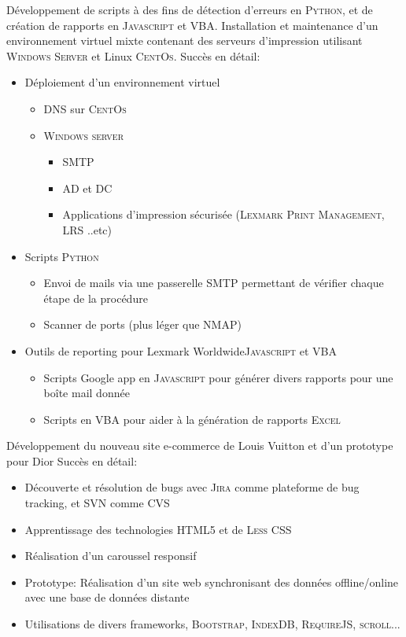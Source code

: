 \documentclass[11pt,a4paper,sans]{moderncv} %
\begin{document}
{Développement de scripts à des fins de détection d'erreurs en \textsc{Python}, et de création de rapports en \textsc{Javascript}
et \textsc{VBA}. Installation et maintenance d'un environnement virtuel mixte contenant des serveurs d'impression utilisant
\textsc{Windows Server} et Linux \textsc{CentOs}.
\newline{}
Succès en détail:
\begin{itemize}
\item Déploiement d'un environnement virtuel
\begin{itemize}
\item DNS sur \textsc{CentOs}
\item \textsc{Windows server}
\begin{itemize}
\item SMTP
\item AD et DC
\item Applications d'impression sécurisée (\textsc{Lexmark Print Management}, \textsc{LRS} ..etc)
\end{itemize}
\end{itemize}
\item Scripts \textsc{Python}
\begin{itemize}
\item Envoi de mails via une passerelle SMTP permettant de vérifier chaque étape de la procédure
\item Scanner de ports (plus léger que \textsc{NMAP})
\end{itemize}
\item Outils de reporting pour Lexmark Worldwide\textsc{Javascript} et \textsc{VBA}
\begin{itemize}
\item Scripts Google app  en \textsc{Javascript} pour générer divers rapports pour une boîte mail donnée
\item Scripts en \textsc{VBA} pour aider à la génération de rapports \textsc{Excel}
\end{itemize}
\end{itemize}
}

{Développement du nouveau site e-commerce de Louis Vuitton et d'un prototype pour Dior
\newline{}
Succès en détail:
\begin{itemize}
\item Découverte et résolution de bugs avec \textsc{Jira} comme plateforme de bug tracking, et \textsc{SVN} comme CVS
\item Apprentissage des technologies  \textsc{HTML5} et de \textsc{Less CSS}
\item Réalisation d'un caroussel responsif
\item Prototype: Réalisation d'un site web synchronisant des données offline/online avec une base de données distante
\item Utilisations de divers frameworks, \textsc{Bootstrap}, \textsc{IndexDB}, \textsc{RequireJS}, \textsc{scroll}...
\end{itemize}
}
\end{document}
